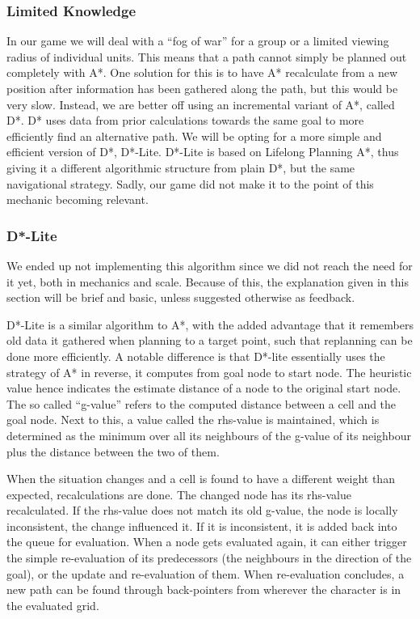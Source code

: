 \subsubsection{Limited Knowledge}
In our game we will deal with a ``fog of war'' for a group or a limited viewing radius of individual units. This means that a path cannot simply be planned out completely with A*. One solution for this is to have A* recalculate from a new position after information has been gathered along the path, but this would be very slow. Instead, we are better off using an incremental variant of A*, called D*. D* uses data from prior calculations towards the same goal to more efficiently find an alternative path. We will be opting for a more simple and efficient version of D*, D*-Lite. D*-Lite is based on Lifelong Planning A*, thus giving it a different algorithmic structure from plain D*, but the same navigational strategy. Sadly, our game did not make it to the point of this mechanic becoming relevant.

\subsubsection{D*-Lite}
We ended up not implementing this algorithm since we did not reach the need for it yet, both in mechanics and scale. Because of this, the explanation given in this section will be brief and basic, unless suggested otherwise as feedback.

D*-Lite is a similar algorithm to A*, with the added advantage that it remembers old data it gathered when planning to a target point, such that replanning can be done more efficiently. A notable difference is that D*-lite essentially uses the strategy of A* in reverse, it computes from goal node to start node. The heuristic value hence indicates the estimate distance of a node to the original start node. The so called ``g-value'' refers to the computed distance between a cell and the goal node. Next to this, a value called the rhs-value is maintained, which is determined as the minimum over all its neighbours of the g-value of its neighbour plus the distance between the two of them.

When the situation changes and a cell is found to have a different weight than expected, recalculations are done. The changed node has its rhs-value recalculated. If the rhs-value does not match its old g-value, the node is locally inconsistent, the change influenced it. If it is inconsistent, it is added back into the queue for evaluation. When a node gets evaluated again, it can either trigger the simple re-evaluation of its predecessors (the neighbours in the direction of the goal), or the update and re-evaluation of them. When re-evaluation concludes, a new path can be found through back-pointers from wherever the character is in the evaluated grid.

